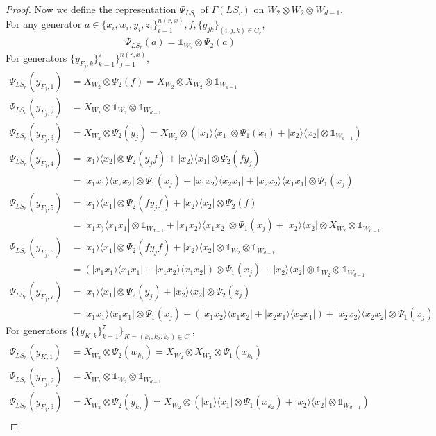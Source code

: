\documentclass[11pt,letterpaper]{article}
\newcommand{\ketbra}[2]{|#1\rangle\langle#2|}
\newcommand{\x}{\otimes}
\newcommand{\1}{\mathbb{1}}
\newcommand{\LS}{LS}
\theoremstyle{definition}
\begin{document}
\begin{proof}
Now we define the representation $\Psi_{\LS_r}$ of
$\Gamma(\LS_r)$ on $W_2 \x W_2 \x W_{d-1}$. For any generator $a \in \{x_i, w_i, y_i, z_i\}_{i=1}^{n(r,x)}, f, \{g_{jk}\}_{(i,j,k) \in C_r}$,
\begin{align}
	\Psi_{\LS_r}(a) = \1_{W_2} \x \Psi_2(a) 
\end{align}
For generators $\{y_{F_j,k}\}_{k=1}^7\}_{j=1}^{n(r,x)}$,
\begin{align*}
	\Psi_{\LS_r}(y_{F_j,1}) &=X_{W_2} \x \Psi_2(f) = X_{W_2} \x X_{W_2} \x \1_{W_{d-1}}\\
	\Psi_{\LS_r}(y_{F_j,2}) &= X_{W_2} \x \1_{W_2} \x \1_{W_{d-1}} \\
	\Psi_{\LS_r}(y_{F_j,3}) &= X_{W_2} \x \Psi_2(y_j) = X_{W_2} \x ( \ketbra{x_1}{x_1} \x \Psi_1(x_i) + \ketbra{x_2}{x_2} \x \1_{W_{d-1}} )\\
	\Psi_{\LS_r}(y_{F_j,4}) &= \ketbra{x_1}{x_2} \x \Psi_2(y_jf) + \ketbra{x_2}{x_1} \x \Psi_2(fy_j)\\
	&= \ketbra{x_1x_1}{x_2x_2} \x \Psi_1(x_j) + \ketbra{x_1x_2}{x_2x_1} + \ketbra{x_2x_2}{x_1x_1} \x \Psi_1(x_j)\\ 
	\Psi_{\LS_r}(y_{F_j,5}) &= \ketbra{x_1}{x_1} \x \Psi_2(fy_jf) + \ketbra{x_2}{x_2} \x \Psi_2(f) \\
	&= \ketbra{x_1x_}{x_1x_1} \x \1_{W_{d-1}} + \ketbra{x_1x_2}{x_1x_2} \x \Psi_1(x_j) +  \ketbra{x_2}{x_2} \x X_{W_2} \x \1_{W_{d-1}}\\
	\Psi_{\LS_r}(y_{F_j,6}) &=  \ketbra{x_1}{x_1} \x \Psi_2(fy_jf) + \ketbra{x_2}{x_2} \x \1_{W_2} \x \1_{W_{d-1}}\\
	&=(\ketbra{x_1x_1}{x_1x_1}+  \ketbra{x_1x_2}{x_1x_2}) \x \Psi_1(x_j) +  \ketbra{x_2}{x_2} \x \1_{W_2} \x \1_{W_{d-1}}\\
	\Psi_{\LS_r}(y_{F_j,7}) &= \ketbra{x_1}{x_1} \x \Psi_2(y_j) + \ketbra{x_2}{x_2} \x \Psi_2(z_j) \\
	&=\ketbra{x_1x_1}{x_1x_1} \x \Psi_1(x_j) + (\ketbra{x_1x_2}{x_1x_2} + \ketbra{x_2x_1}{x_2x_1}) + \ketbra{x_2x_2}{x_2x_2} \x \Psi_1(x_j)
\end{align*}
For generators $\{\{y_{K,k}\}_{k=1}^7\}_{K=(k_1,k_2,k_3) \in C_r}$,
\begin{align*}
	\Psi_{\LS_r}(y_{K,1}) &= X_{W_2} \x \Psi_2(w_{k_1}) = X_{W_2} \x X_{W_2} \x \Psi_1(x_{k_1}) \\
	\Psi_{\LS_r}(y_{F_j,2}) &= X_{W_2} \x \1_{W_2} \x \1_{W_{d-1}}\\
	\Psi_{\LS_r}(y_{F_j,3}) &= X_{W_2} \x \Psi_2(y_{k_2}) = X_{W_2} \x (\ketbra{x_1}{x_1} \x \Psi_1(x_{k_2}) + \ketbra{x_2}{x_2} \x \1_{W_{d-1}})\\

\end{align*}
\end{proof}
\end{document}
